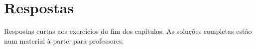 \chapter{Respostas}
\label{sec:answers}

Respostas curtas aos exercícios do fim dos capítulos. As soluções completas estão num material à parte, para professores.























